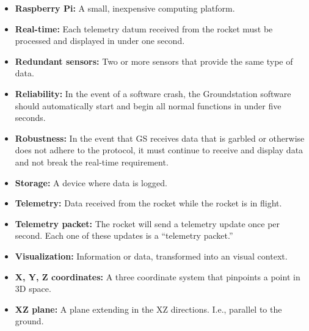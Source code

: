 \documentclass[10pt,draftclsnofoot,onecolumn]{IEEEtran}
\begin{document}
\begin{itemize}
		\item \textbf{Raspberry Pi:} A small, inexpensive computing platform.		
		\item \textbf{Real-time:} Each telemetry datum received from the rocket must be processed and
		displayed in under one second.
		\item \textbf{Redundant sensors:} Two or more sensors that provide the same type of data.
		\item \textbf{Reliability:} In the event of a software crash, the Groundstation software should automatically
		start and begin all normal functions in under five seconds.
		\item \textbf{Robustness:} In the event that GS receives data that is garbled or otherwise does not adhere
		to the protocol, it must continue to receive and display data and not break the real-time requirement.
		\item \textbf{Storage:} A device where data is logged.		
		\item \textbf{Telemetry:} Data received from the rocket while the rocket is in flight.
		\item \textbf{Telemetry packet:} The rocket will send a telemetry update once per second. Each one of these updates is a ``telemetry packet.''
		\item \textbf{Visualization:} Information or data, transformed into an visual context.
		\item \textbf{X, Y, Z coordinates:} A three coordinate system that pinpoints a point in 3D space.
		\item \textbf{XZ plane:} A plane extending in the XZ directions. I.e., parallel to the ground.
	\end{itemize}

























\newpage
\end{document}
